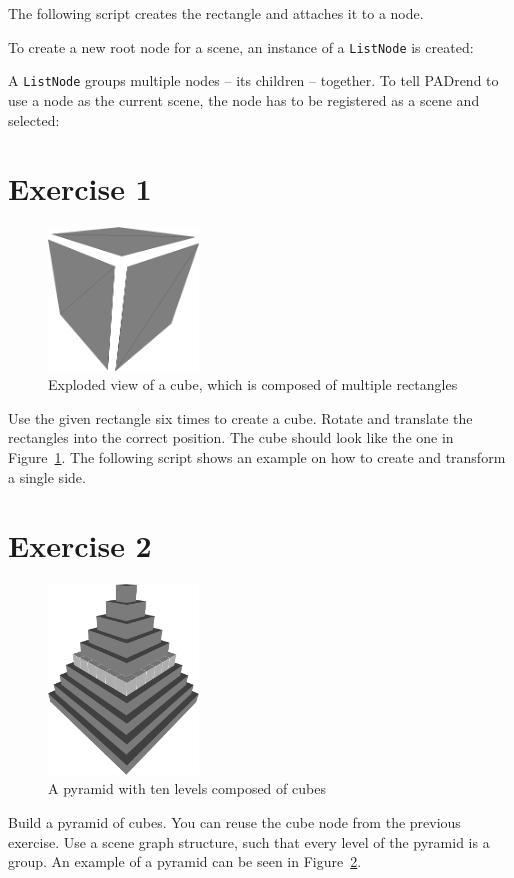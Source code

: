\documentclass[a4paper,DIV=12]{scrartcl}
\begin{document}
The following script creates the rectangle and attaches it to a node.


To create a new root node for a scene, an instance of a \lstinline!ListNode! is created:


A \lstinline!ListNode! groups multiple nodes -- its children -- together.
To tell PADrend to use a node as the current scene, the node has to be registered as a scene and selected:

\section*{Exercise 1}
\begin{figure}[htbp]
	\centering
	\includegraphics[width=4cm]{cube}
	\caption{Exploded view of a cube, which is composed of multiple rectangles}
	\label{fig:cube}
\end{figure}
Use the given rectangle six times to create a cube.
Rotate and translate the rectangles into the correct position.
The cube should look like the one in Figure~\ref{fig:cube}.
The following script shows an example on how to create and transform a single side.

\section*{Exercise 2}
\begin{figure}[htbp]
	\centering
	\includegraphics[width=4cm]{pyramid_gray}
	\caption{A pyramid with ten levels composed of cubes}
	\label{fig:pyramid_gray}
\end{figure}
Build a pyramid of cubes.
You can reuse the cube node from the previous exercise.
Use a scene graph structure, such that every level of the pyramid is a group.
An example of a pyramid can be seen in Figure~\ref{fig:pyramid_gray}.
\end{document}
